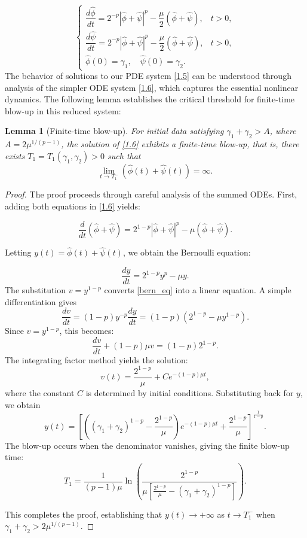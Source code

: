 \documentclass[
  sn-mathphys-num,
  colorlinks,
  linkcolor=darkmagenta,
  citecolor=rufous,
  urlcolor=zaffre,
  hypertexnames=false
]{sn-jnl}
\numberwithin{equation}{section}
\newtheorem{lemma}[theorem]{Lemma}%
\begin{document}
\begin{equation}
\label{1.6}
\begin{cases}
\dfrac{d\hat{\phi}}{dt} = 2^{-p}|\hat{\phi} + \hat{\psi}|^p - \dfrac{\mu}{2}(\hat{\phi} + \hat{\psi}), & t > 0, \\[8pt]
\dfrac{d\hat{\psi}}{dt} = 2^{-p}|\hat{\phi} + \hat{\psi}|^p - \dfrac{\mu}{2}(\hat{\phi} + \hat{\psi}), & t > 0, \\[8pt]
\hat{\phi}(0) = \gamma_1, \quad \hat{\psi}(0) = \gamma_2.
\end{cases}
\end{equation}
The behavior of solutions to our PDE system \eqref{1.5} can be understood through analysis of the simpler ODE system \eqref{1.6}, which captures the essential nonlinear dynamics. The following lemma establishes the critical threshold for finite-time blow-up in this reduced system:
\begin{lemma}[Finite-time blow-up]\label{lem21}
For initial data satisfying $\gamma_1 + \gamma_2 > A$, where $A = 2\mu^{1/(p-1)}$, the solution of \eqref{1.6} exhibits a finite-time blow-up, that is, there exists $T_1 = T_1(\gamma_1,\gamma_2) > 0$ such that $$\lim\limits_{t\to T_1^-} (\hat{\phi}(t) + \hat{\psi}(t)) = \infty.$$
\end{lemma}
\begin{proof}
The proof proceeds through careful analysis of the summed ODEs. First, adding both equations in \eqref{1.6} yields:

$$
\frac{d}{dt}(\hat{\phi} + \hat{\psi}) = 2^{1-p}|\hat{\phi} + \hat{\psi}|^p - \mu(\hat{\phi} + \hat{\psi}).
$$

Letting $y(t) = \hat{\phi}(t) + \hat{\psi}(t)$, we obtain the Bernoulli equation:

\begin{equation}
\frac{dy}{dt} = 2^{1-p}y^p - \mu y.
\label{bern_eq}
\end{equation}
The substitution $v = y^{1-p}$ converts \eqref{bern_eq} into a linear equation. A simple differentiation gives
$$
\frac{dv}{dt} = (1-p)y^{-p}\frac{dy}{dt} = (1-p)(2^{1-p} - \mu y^{1-p}).
$$
Since $v = y^{1-p}$, this becomes:
$$
\frac{dv}{dt} + (1-p)\mu v = (1-p)2^{1-p}.
$$
The integrating factor method yields the solution:
$$
v(t) = \frac{2^{1-p}}{\mu} + Ce^{-(1-p)\mu t},
$$
where the constant $C$ is determined by initial conditions. Substituting back for $y$, we obtain
$$
y(t) = \left[ \left( (\gamma_1+\gamma_2)^{1-p} - \frac{2^{1-p}}{\mu} \right) e^{-(1-p)\mu t} + \frac{2^{1-p}}{\mu} \right]^{\frac{1}{1-p}}.
$$
The blow-up occurs when the denominator vanishes, giving the finite blow-up time:
$$
T_1 = \frac{1}{(p-1)\mu} \ln\left( \frac{2^{1-p}}{\mu\left[\frac{2^{1-p}}{\mu} - (\gamma_1+\gamma_2)^{1-p}\right]} \right).
$$

This completes the proof, establishing that $y(t) \to +\infty$ as $t \to T_1^-$ when $\gamma_1 + \gamma_2 > 2\mu^{1/(p-1)}$.
\end{proof}
\end{document}
